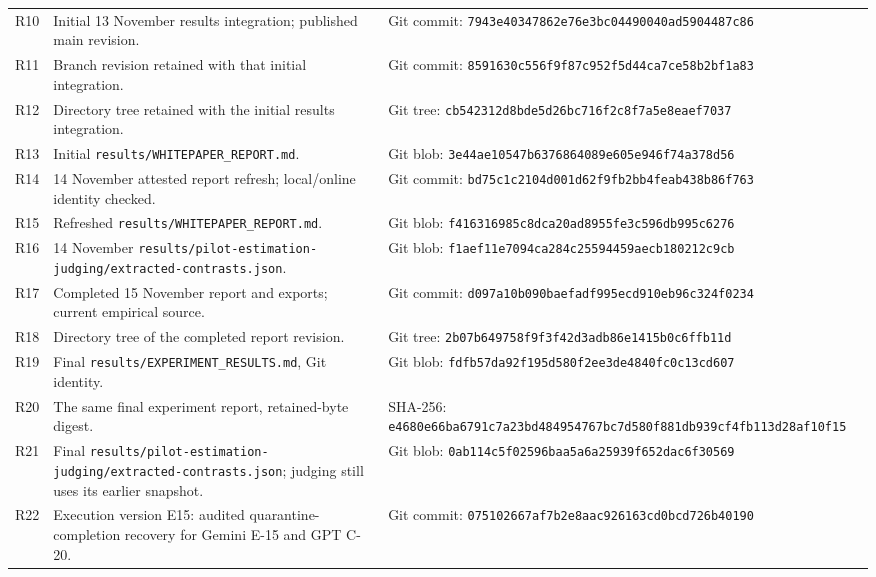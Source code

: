 \documentclass[11pt,a4paper]{article}
\begin{document}
\begin{longtable}{@{}L{0.7cm}L{6.2cm}L{8.1cm}@{}}
\label{prov:R10}R10 & Initial 13 November results integration; published main revision. & Git commit: \nolinkurl{7943e40347862e76e3bc04490040ad5904487c86} \\
\label{prov:R11}R11 & Branch revision retained with that initial integration. & Git commit: \nolinkurl{8591630c556f9f87c952f5d44ca7ce58b2bf1a83} \\
\label{prov:R12}R12 & Directory tree retained with the initial results integration. & Git tree: \nolinkurl{cb542312d8bde5d26bc716f2c8f7a5e8eaef7037} \\
\label{prov:R13}R13 & Initial \nolinkurl{results/WHITEPAPER_REPORT.md}. & Git blob: \nolinkurl{3e44ae10547b6376864089e605e946f74a378d56} \\
\label{prov:R14}R14 & 14 November attested report refresh; local/online identity checked. & Git commit: \nolinkurl{bd75c1c2104d001d62f9fb2bb4feab438b86f763} \\
\label{prov:R15}R15 & Refreshed \nolinkurl{results/WHITEPAPER_REPORT.md}. & Git blob: \nolinkurl{f416316985c8dca20ad8955fe3c596db995c6276} \\
\label{prov:R16}R16 & 14 November \nolinkurl{results/pilot-estimation-judging/extracted-contrasts.json}. & Git blob: \nolinkurl{f1aef11e7094ca284c25594459aecb180212c9cb} \\
\label{prov:R17}R17 & Completed 15 November report and exports; current empirical source. & Git commit: \nolinkurl{d097a10b090baefadf995ecd910eb96c324f0234} \\
\label{prov:R18}R18 & Directory tree of the completed report revision. & Git tree: \nolinkurl{2b07b649758f9f3f42d3adb86e1415b0c6ffb11d} \\
\label{prov:R19}R19 & Final \nolinkurl{results/EXPERIMENT_RESULTS.md}, Git identity. & Git blob: \nolinkurl{fdfb57da92f195d580f2ee3de4840fc0c13cd607} \\
\label{prov:R20}R20 & The same final experiment report, retained-byte digest. & SHA-256: \nolinkurl{e4680e66ba6791c7a23bd484954767bc7d580f881db939cf4fb113d28af10f15} \\
\label{prov:R21}R21 & Final \nolinkurl{results/pilot-estimation-judging/extracted-contrasts.json}; judging still uses its earlier snapshot. & Git blob: \nolinkurl{0ab114c5f02596baa5a6a25939f652dac6f30569} \\
\label{prov:R22}R22 & Execution version E15: audited quarantine-completion recovery for Gemini E-15 and GPT C-20. & Git commit: \nolinkurl{075102667af7b2e8aac926163cd0bcd726b40190} \\

\end{longtable}
\end{document}
